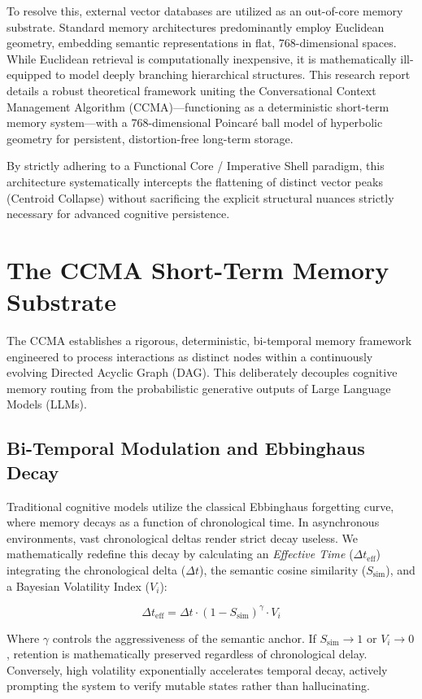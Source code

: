 \documentclass[11pt, a4paper]{article}
\begin{document}
	To resolve this, external vector databases are utilized as an out-of-core memory substrate. Standard memory architectures predominantly employ Euclidean geometry, embedding semantic representations in flat, 768-dimensional spaces. While Euclidean retrieval is computationally inexpensive, it is mathematically ill-equipped to model deeply branching hierarchical structures. This research report details a robust theoretical framework uniting the Conversational Context Management Algorithm (CCMA)---functioning as a deterministic short-term memory system---with a 768-dimensional Poincaré ball model of hyperbolic geometry for persistent, distortion-free long-term storage. 

    By strictly adhering to a Functional Core / Imperative Shell paradigm, this architecture systematically intercepts the flattening of distinct vector peaks (Centroid Collapse) without sacrificing the explicit structural nuances strictly necessary for advanced cognitive persistence.
	
	\section{The CCMA Short-Term Memory Substrate}
	The CCMA establishes a rigorous, deterministic, bi-temporal memory framework engineered to process interactions as distinct nodes within a continuously evolving Directed Acyclic Graph (DAG). This deliberately decouples cognitive memory routing from the probabilistic generative outputs of Large Language Models (LLMs).
	
	\subsection{Bi-Temporal Modulation and Ebbinghaus Decay}
	Traditional cognitive models utilize the classical Ebbinghaus forgetting curve, where memory decays as a function of chronological time. In asynchronous environments, vast chronological deltas render strict decay useless. We mathematically redefine this decay by calculating an \textit{Effective Time} ($\Delta t_{\text{eff}}$) integrating the chronological delta ($\Delta t$), the semantic cosine similarity ($S_{\text{sim}}$), and a Bayesian Volatility Index ($V_i$):
	
	\begin{equation}
		\Delta t_{\text{eff}} = \Delta t \cdot (1 - S_{\text{sim}})^\gamma \cdot V_i
	\end{equation}
	
	Where $\gamma$ controls the aggressiveness of the semantic anchor. If $S_{\text{sim}} \to 1$ or $V_i \to 0$, retention is mathematically preserved regardless of chronological delay. Conversely, high volatility exponentially accelerates temporal decay, actively prompting the system to verify mutable states rather than hallucinating.
	
\end{document}
